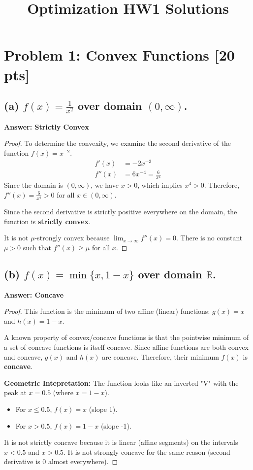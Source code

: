 \documentclass{article}
\title{Optimization HW1 Solutions}
\author{}
\date{}
\begin{document}
\maketitle

\section*{Problem 1: Convex Functions [20 pts]}

\subsection*{(a) $f(x) = \frac{1}{x^2}$ over domain $(0, \infty)$.}

\textbf{Answer: Strictly Convex}

\begin{proof}
To determine the convexity, we examine the second derivative of the function $f(x) = x^{-2}$.
\begin{align*}
f'(x) &= -2x^{-3} \\
f''(x) &= 6x^{-4} = \frac{6}{x^4}
\end{align*}
Since the domain is $(0, \infty)$, we have $x > 0$, which implies $x^4 > 0$.
Therefore, $f''(x) = \frac{6}{x^4} > 0$ for all $x \in (0, \infty)$.

Since the second derivative is strictly positive everywhere on the domain, the function is \textbf{strictly convex}.

It is not $\mu$-strongly convex because $\lim_{x \to \infty} f''(x) = 0$. There is no constant $\mu > 0$ such that $f''(x) \ge \mu$ for all $x$.
\end{proof}

\subsection*{(b) $f(x) = \min\{x, 1-x\}$ over domain $\mathbb{R}$.}

\textbf{Answer: Concave}

\begin{proof}
This function is the minimum of two affine (linear) functions: $g(x) = x$ and $h(x) = 1-x$.

A known property of convex/concave functions is that the pointwise minimum of a set of concave functions is itself concave. Since affine functions are both convex and concave, $g(x)$ and $h(x)$ are concave. Therefore, their minimum $f(x)$ is \textbf{concave}.

\textbf{Geometric Intepretation:}
The function looks like an inverted "V" with the peak at $x = 0.5$ (where $x = 1-x$).
\begin{itemize}
    \item For $x \le 0.5$, $f(x) = x$ (slope 1).
    \item For $x > 0.5$, $f(x) = 1-x$ (slope -1).
\end{itemize}
It is not strictly concave because it is linear (affine segments) on the intervals $x < 0.5$ and $x > 0.5$. It is not strongly concave for the same reason (second derivative is 0 almost everywhere).
\end{proof}
\end{document}
